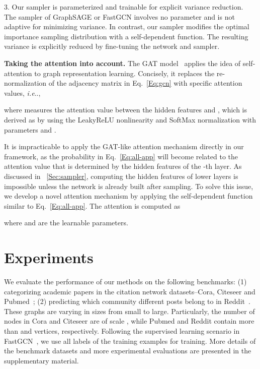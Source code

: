 \documentclass{article}
\makeatletter
\DeclareRobustCommand\onedot{\futurelet\@let@token\@onedot}
\def\@onedot{\ifx\@let@token.\else.\null\fi\xspace}
\def\ie{\emph{i.e}\onedot} \def\Ie{\emph{I.e}\onedot}
\makeatother
\begin{document}
3. Our sampler is parameterized and trainable for explicit variance reduction. The sampler of GraphSAGE or FastGCN involves no parameter and is not adaptive for minimizing variance.
In contrast, our sampler modifies the optimal importance sampling distribution with a self-dependent function. The resulting variance is explicitly reduced by fine-tuning the network and sampler.


\textbf{Taking the attention into account.}
The GAT model~\cite{velivckovic2017graph} applies the idea of self-attention to graph representation learning.
Concisely, it replaces the re-normalization of the adjacency matrix in Eq.~\eqref{Eq:gcn} with specific attention values, \ie,

where  measures the attention value between the hidden features  and , which is derived as  by using the LeakyReLU nonlinearity  and SoftMax normalization with parameters  and .

It is impracticable to apply the GAT-like attention mechanism directly in our framework, as the probability  in Eq.~\eqref{Eq:all-app} will become related to the attention value  that is determined by the hidden features of the -th layer. As discussed in \textsection~\ref{Sec:sampler}, computing the hidden features of lower layers is impossible unless the network is already built after sampling. To solve this issue,
we develop a novel attention mechanism by applying the self-dependent function similar to Eq.~\eqref{Eq:all-app}.
The attention is computed as
\vskip -0.3in

\vskip -0.1in
where  and  are the learnable parameters.

\section{Experiments}

We evaluate the performance of our methods on the following benchmarks: (1) categorizing academic papers in the citation network datasets--Cora, Citeseer and Pubmed~\cite{sen2008collective}; (2) predicting which community different posts belong to in Reddit~\cite{hamilton2017inductive}. These graphs are varying in sizes from small to large. Particularly, the number of nodes in Cora and Citeseer are of scale , while Pubmed and Reddit contain more than  and   vertices, respectively.
Following the supervised learning scenario in FastGCN~\cite{chen2018fastgcn}, we use all labels of the training examples for training. More details of the benchmark datasets and more experimental evaluations are presented in the supplementary material.
\end{document}
